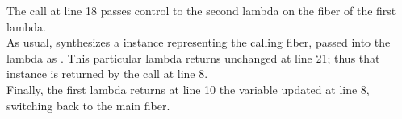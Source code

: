 
The  call at line 18 passes control to the second
lambda on the fiber of the first lambda.\\

As usual, \resumewith synthesizes a \fiber instance representing the calling
fiber, passed into the lambda as . This particular lambda returns 
unchanged at line 21; thus that  instance is returned by the \resume call
at line 8.\\

Finally, the first lambda returns at line 10 the  variable updated at
line 8, switching back to the main fiber.\\

